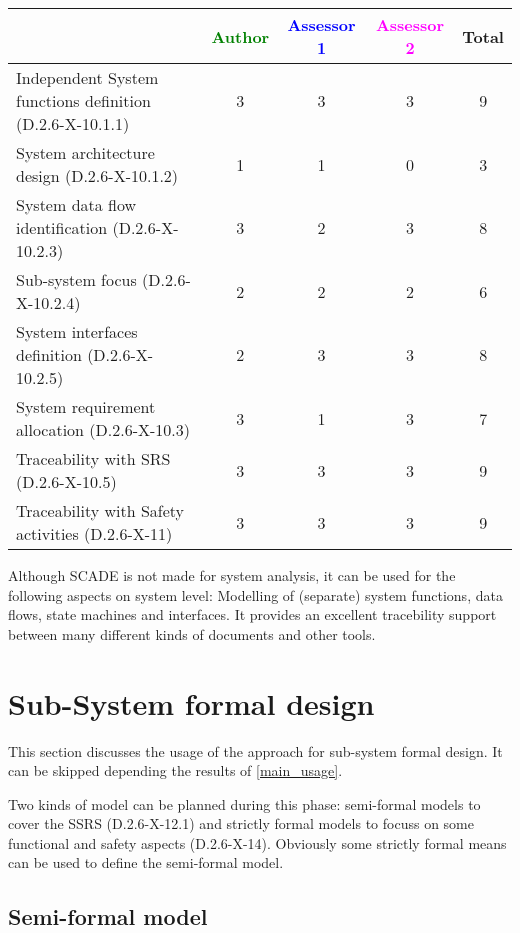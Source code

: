 \begin{tabular}{|l | c | c | c | c|}
\hline
& \textcolor{green}{Author} & \textcolor{blue}{Assessor 1} & \textcolor{magenta}{Assessor 2} & Total \\
\hline
Independent System functions definition (D.2.6-X-10.1.1)  &
3& 3 &3 &  9 \\
\hline 
System architecture design (D.2.6-X-10.1.2) & 1 & 1 &
0& 3  \\
\hline
System data flow identification (D.2.6-X-10.2.3)  &
3& 2 &3 &  8 \\
\hline
Sub-system focus (D.2.6-X-10.2.4)  &  2& 2 &2 &  6 \\
\hline
System interfaces definition (D.2.6-X-10.2.5)  &
2& 3 &3 & 8  \\
\hline
System requirement allocation (D.2.6-X-10.3)  &  3&
1 &3 &  7 \\
\hline
Traceability with SRS (D.2.6-X-10.5)  &  3& 3 &3 & 9  \\
\hline
Traceability with Safety activities (D.2.6-X-11)  &
3 & 3 &3 & 9  \\
\hline
\end{tabular}

\begin{author_comment}
Although SCADE is not made for system analysis, it can be used for the following aspects on system level: Modelling of (separate) system functions, data flows, state machines and interfaces. It provides an excellent tracebility support between many different kinds of documents and other tools.  
\end{author_comment}


\section{Sub-System formal design}
This section discusses the usage of the approach for sub-system formal design.
It can be skipped depending the results of \ref{main_usage}.

Two kinds of model can be planned during this phase: semi-formal models to  cover the SSRS (D.2.6-X-12.1) and strictly formal  models to  focuss on some functional and safety aspects (D.2.6-X-14).  Obviously some strictly  formal means can be used to define the semi-formal  model.

\subsection{Semi-formal model}

